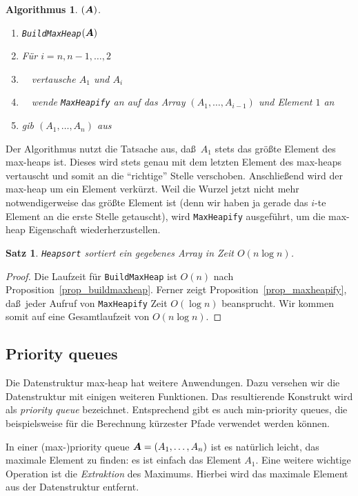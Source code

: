 \documentclass[10pt,reqno]{amsart}
\numberwithin{equation}{section}
\newcommand\vA{\vec A}
\def\vec#1{\mathchoice{\mbox{\boldmath$\displaystyle#1$}}
{\mbox{\boldmath$\textstyle#1$}}
{\mbox{\boldmath$\scriptstyle#1$}}
{\mbox{\boldmath$\scriptscriptstyle#1$}}}
\newtheorem{theorem}[definition]{Satz}
\newtheorem{algorithm}[definition]{Algorithmus}
\newcommand\Prop{Proposition}
\begin{document}
\begin{algorithm}$(\vA)$.\label{alg_heapsort}
	\begin{enumerate}
		\item {\tt BuildMaxHeap}$(\vA)$
		\item F\"ur $i=n,n-1,\ldots,2$
		\item $\quad$vertausche $A_1$ und $A_i$
		\item $\quad$wende {\tt MaxHeapify} an auf das Array $(A_1,\ldots,A_{i-1})$ und Element $1$ an
		\item gib $(A_1,\ldots,A_n)$ aus
	\end{enumerate}
\end{algorithm}

Der Algorithmus nutzt die Tatsache aus, da\ss\ $A_1$ stets das gr\"o\ss te Element des max-heaps ist.
Dieses wird stets genau mit dem letzten Element des max-heaps vertauscht und somit an die ``richtige'' Stelle verschoben.
Anschlie\ss end wird der max-heap um ein Element verk\"urzt.
Weil die Wurzel jetzt nicht mehr notwendigerweise das gr\"o\ss te Element ist (denn wir haben ja gerade das $i$-te Element an die erste Stelle getauscht), wird {\tt MaxHeapify} ausgef\"uhrt, um die max-heap Eigenschaft wiederherzustellen.

\begin{theorem}\label{thm_heapsort}
	{\tt Heapsort} sortiert ein gegebenes Array in Zeit $O(n\log n)$.
\end{theorem}
\begin{proof}
	Die Laufzeit f\"ur {\tt BuildMaxHeap} ist $O(n)$ nach \Prop~\ref{prop_buildmaxheap}.
	Ferner zeigt \Prop~\ref{prop_maxheapify}, da\ss\ jeder Aufruf von {\tt MaxHeapify} Zeit $O(\log n)$ beansprucht.
	Wir kommen somit auf eine Gesamtlaufzeit von $O(n\log n)$.
\end{proof}

\subsection{Priority queues}\label{sec_priority}
Die Datenstruktur max-heap hat weitere Anwendungen.
Dazu versehen wir die Datenstruktur mit einigen weiteren Funktionen.
Das resultierende Konstrukt wird als {\em priority queue} bezeichnet.
Entsprechend gibt es auch min-priority queues, die beispielsweise f\"ur die Berechnung k\"urzester Pfade verwendet werden k\"onnen.

In einer (max-)priority queue $\vA=(A_1,\ldots,A_n)$ ist es nat\"urlich leicht, das maximale Element zu finden: es ist einfach das Element $A_1$.
Eine weitere wichtige Operation ist die {\em Extraktion} des Maximums.
Hierbei wird das maximale Element aus der Datenstruktur entfernt.
\end{document}
